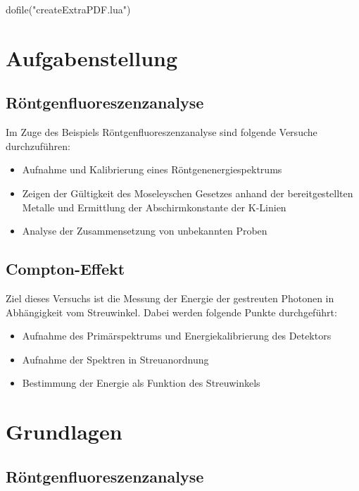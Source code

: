 \documentclass[12pt,english,ngerman]{scrartcl}
\begin{document}
\begin{luacode*}
	dofile("createExtraPDF.lua")
\end{luacode*}

%
\tableofcontents

\newpage

\section{Aufgabenstellung\label{Auf}}

\subsection{Röntgenfluoreszenzanalyse}

Im Zuge des Beispiels Röntgenfluoreszenzanalyse sind folgende Versuche
durchzuführen:

\begin{itemize}
	\item Aufnahme und Kalibrierung eines Röntgenenergiespektrums
	\item Zeigen der Gültigkeit des Moseleyschen Gesetzes anhand der bereitgestellten
	      Metalle und Ermittlung der Abschirmkonstante der K-Linien
	\item Analyse der Zusammensetzung von unbekannten Proben
\end{itemize}

\subsection{Compton-Effekt}

Ziel dieses Versuchs ist die Messung der Energie der gestreuten Photonen in
Abhängigkeit vom Streuwinkel. Dabei werden folgende Punkte durchgeführt:

\begin{itemize}
	\item Aufnahme des Primärspektrums und Energiekalibrierung des Detektors
	\item Aufnahme der Spektren in Streuanordnung
	\item Bestimmung der Energie als Funktion des Streuwinkels
\end{itemize}

\section{Grundlagen}\label{Grund}

\subsection{Röntgenfluoreszenzanalyse}
\end{document}
